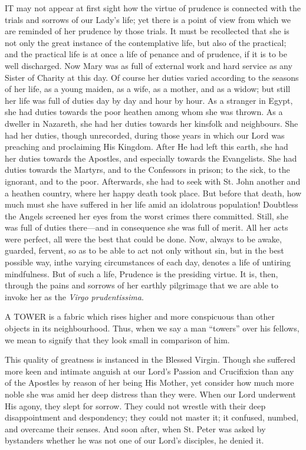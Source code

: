 IT
may not appear at first sight how the virtue of prudence is connected
with the trials and sorrows of our Lady's life; yet there is a point of
view from which we are reminded of her prudence by those trials. It must
be recollected that she is not only the great instance of the
contemplative life, but also of the practical; and the practical life is
at once a life of penance and of prudence, if it is to be well
discharged. Now Mary was as full of external work and hard service as
any Sister of Charity at this day. Of course her duties varied according
to the seasons of her life, as a young maiden, as a wife, as a mother,
and as a widow; but still her life was full of duties day by day and
hour by hour. As a stranger in Egypt, she had duties towards the poor
heathen among whom she was thrown. As a dweller in Nazareth, she had her
duties towards her kinsfolk and neighbours. She had her duties, though
unrecorded, during those years in which our Lord was preaching and
proclaiming His Kingdom. After He had left this earth, she had her
duties towards the Apostles, and especially towards the Evangelists. She
had duties towards the Martyrs, and to the Confessors in prison; to the
sick, to the ignorant, and to the poor. Afterwards, she had to seek with
St. John another and a heathen country, where her happy death took
place. But before that death, how much must she have suffered in her
life amid an idolatrous population! Doubtless the Angels screened her
eyes from the worst crimes there committed. Still, she was full of
duties there—and in consequence she was full of merit. All her acts
were perfect, all were the best that could be done. Now, always to be
awake, guarded, fervent, so as to be able to act not only without sin,
but in the best possible way, in\emph{}the varying circumstances of
each day, denotes a life of untiring mindfulness. But of such a life,
Prudence is the presiding virtue. It is, then, through the pains and
sorrows of her earthly pilgrimage that we are able to invoke her as the \emph{Virgo
prudentissima}.



A TOWER
is a fabric which rises higher and more conspicuous than other objects
in its neighbourhood. Thus, when we say a man ``towers'' over his fellows,
we mean to signify that they look small in comparison of him.

This quality of greatness is
instanced in the Blessed Virgin. Though she suffered more keen and
intimate anguish at our Lord's Passion and Crucifixion than any of the
Apostles by reason of her being His Mother, yet consider how much more
noble she was amid her deep distress than they were. When our Lord
underwent His agony, they slept for sorrow. They could not wrestle with
their deep disappointment and despondency; they could not master it; it
confused, numbed, and overcame their senses. And soon after, when St.
Peter was asked by bystanders whether he was not one of our Lord's
disciples, he denied it.

